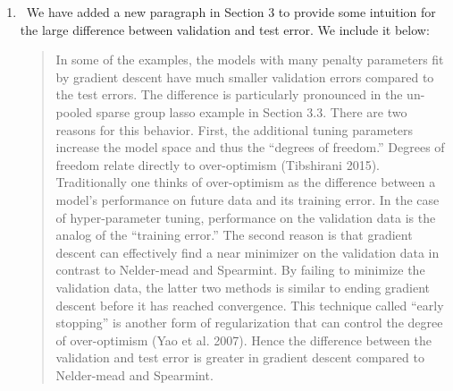 \documentclass[]{article}
\newcommand{\reply}{\item[]\ }
\begin{document}
\begin{enumerate}
		\reply We have added a new paragraph in Section 3 to provide some intuition for the large difference between validation and test error. We include it below:
		\begin{quote}
			In some of the examples, the models with many penalty parameters fit by gradient descent have much smaller validation errors compared to the test errors. The difference is particularly pronounced in the un-pooled sparse group lasso example in Section 3.3. There are two reasons for this behavior. First, the additional tuning parameters increase the model space and thus the “degrees of freedom.” Degrees of freedom relate directly to over-optimism (Tibshirani 2015). Traditionally one thinks of over-optimism as the difference between a model’s performance on future data and its training error. In the case of hyper-parameter tuning, performance on the validation data is the analog of the “training error.” The second reason is that gradient descent can effectively find a near minimizer on the validation data in contrast to Nelder-mead and Spearmint. By failing to minimize the validation data, the latter two methods is similar to ending gradient descent before it has reached convergence. This technique called “early stopping” is another form of regularization that can control the degree of over-optimism (Yao et al. 2007). Hence the difference between the validation and test error is greater in gradient descent compared to Nelder-mead and Spearmint.
		\end{quote}
		
	\end{enumerate} 
	
\end{document}

